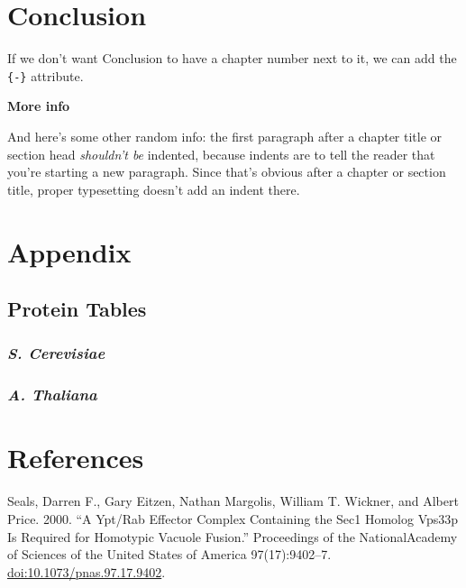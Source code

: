 \documentclass[12pt,twoside]{reedthesis}
\begin{document}
\chapter*{Conclusion}\label{conclusion}

If we don't want Conclusion to have a chapter number next to it, we can add the \texttt{\{-\}} attribute.

\textbf{More info}

And here's some other random info: the first paragraph after a chapter title or section head \emph{shouldn't be} indented, because indents are to tell the reader that you're starting a new paragraph. Since that's obvious after a chapter or section title, proper typesetting doesn't add an indent there.

\chapter*{Appendix}\label{appendix}

\section*{Protein Tables}\label{protein-tables}

\subsection*{\texorpdfstring{\emph{S. Cerevisiae}}{S. Cerevisiae}}\label{s.-cerevisiae}

\subsection*{\texorpdfstring{\emph{A. Thaliana}}{A. Thaliana}}\label{a.-thaliana}

\backmatter

\chapter*{References}\label{references}


\noindent 

\setlength{\parindent}{-0.20in}

Seals, Darren F., Gary Eitzen, Nathan Margolis, William T. Wickner, and Albert Price. 2000. ``A Ypt/Rab Effector Complex Containing the Sec1 Homolog Vps33p Is Required for Homotypic Vacuole Fusion.'' Proceedings of the NationalAcademy of Sciences of the United States of America 97(17):9402--7. \url{doi:10.1073/pnas.97.17.9402}.


\end{document}
